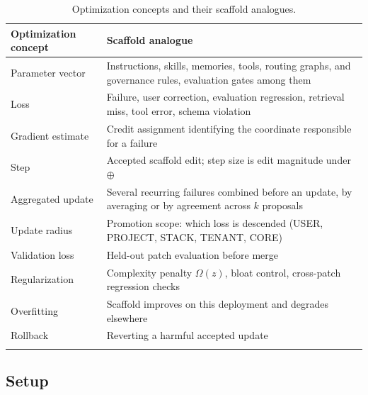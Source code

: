 \documentclass[
  11pt,
]{article}
\begin{document}
\begin{table}[htbp]
\caption{Optimization concepts and their scaffold analogues.}\label{tab:A-1}
\centering\small
\begin{tabular}{@{}
  >{\raggedright\arraybackslash}p{}
  >{\raggedright\arraybackslash}p{}@{}}
\toprule\noalign{}
\begin{minipage}[b]{\linewidth}\raggedright
Optimization concept
\end{minipage} & \begin{minipage}[b]{\linewidth}\raggedright
Scaffold analogue
\end{minipage} \\
\midrule\noalign{}


Parameter vector & Instructions, skills, memories, tools, routing graphs, and governance rules, evaluation gates among them \\ \addlinespace[2.5pt]
Loss & Failure, user correction, evaluation regression, retrieval miss, tool error, schema violation \\ \addlinespace[2.5pt]
Gradient estimate & Credit assignment identifying the coordinate responsible for a failure \\ \addlinespace[2.5pt]
Step & Accepted scaffold edit; step size is edit magnitude under \(\oplus\) \\ \addlinespace[2.5pt]
Aggregated update & Several recurring failures combined before an update, by averaging or by agreement across \(k\) proposals \\ \addlinespace[2.5pt]
Update radius & Promotion scope: which loss is descended (USER, PROJECT, STACK, TENANT, CORE) \\ \addlinespace[2.5pt]
Validation loss & Held-out patch evaluation before merge \\ \addlinespace[2.5pt]
Regularization & Complexity penalty \(\Omega(z)\), bloat control, cross-patch regression checks \\ \addlinespace[2.5pt]
Overfitting & Scaffold improves on this deployment and degrades elsewhere \\ \addlinespace[2.5pt]
Rollback & Reverting a harmful accepted update \\ \addlinespace[2.5pt]
\bottomrule\noalign{}
\end{tabular}
\end{table}

\subsection{Setup}\label{setup}
\end{document}
